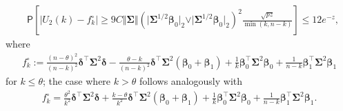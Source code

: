 \documentclass[11pt, a4paper]{article}
\renewcommand{\l}{\left}
\renewcommand{\r}{\right}
\newcommand{\cp}{\theta}
\newcommand{\p}{\mathsf{P}}
\theoremstyle{definition}
\theoremstyle{definition}
\theoremstyle{definition}
\theoremstyle{definition}
\theoremstyle{definition}
\theoremstyle{remark}
\theoremstyle{definition}
\theoremstyle{definition}
\theoremstyle{definition}
\begin{document}
\begin{align*}
& \p\l[ \l\vert U_2(k) - f^\circ_k \r\vert \ge 
9 C \Vert \bm\Sigma \Vert (\vert \bm\Sigma^{1/2} \bm\beta_0 \vert_2 \vee \vert \bm\Sigma^{1/2} \bm\beta_0 \vert_2)^2 \frac{\sqrt{pz}}{\min(k, n - k)} \r] \le 12 e^{-z},
\end{align*}
where
\begin{align*}
f^\circ_k := \frac{(n - \cp)^2}{(n - k)^2} \bm\delta^\top \bm\Sigma^2 \bm\delta - \frac{\cp - k}{(n - k)^2} \bm\delta^\top \bm\Sigma^2 (\bm\beta_0 + \bm\beta_1) + \frac{1}{k} \bm\beta_0^\top \bm\Sigma^2 \bm\beta_0 + \frac{1}{n - k} \bm\beta_1^\top \bm\Sigma^2 \bm\beta_1
\end{align*}
for $k \le \cp$; the case where $k > \cp$ follows analogously with
\begin{align*}
f^\circ_k = \frac{\cp^2}{k^2} \bm\delta^\top \bm\Sigma^2 \bm\delta + \frac{k - \cp}{k^2} \bm\delta^\top \bm\Sigma^2 (\bm\beta_0 + \bm\beta_1) + \frac{1}{k} \bm\beta_0^\top \bm\Sigma^2 \bm\beta_0 + \frac{1}{n - k} \bm\beta_1^\top \bm\Sigma^2 \bm\beta_1.
\end{align*}
\end{document}
